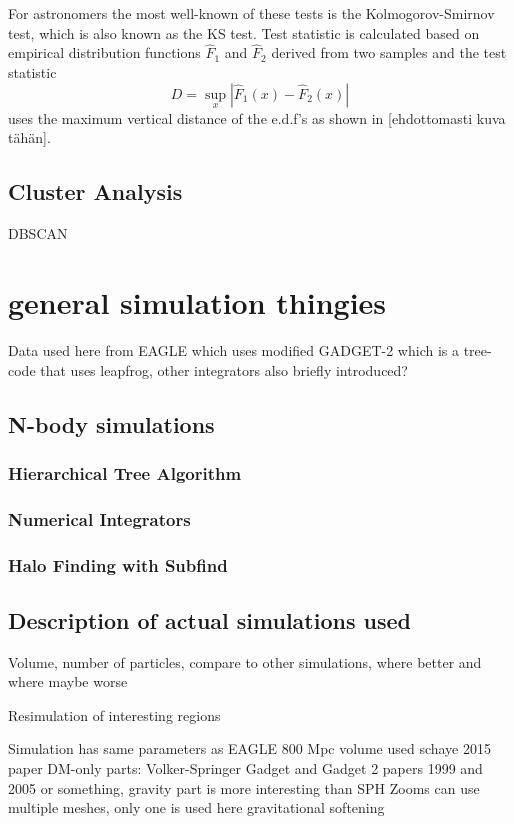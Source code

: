 \documentclass[english, oneside]{HYgradu}
\begin{document}
For astronomers the most well-known of these tests is the Kolmogorov-Smirnov test, which is also known as the KS test. Test statistic is calculated based on empirical distribution functions $\hat{F}_1$ and $\hat{F}_2$ derived from two samples and the test statistic
\begin{equation}
	D = \sup_{x} |\hat{F}_1(x) - \hat{F}_2(x)|
\end{equation}
uses the maximum vertical distance of the e.d.f's as shown in [ehdottomasti kuva tähän]. \citep{feigelson2012modern, bohm2010introduction}




\section{Cluster Analysis}
DBSCAN

\chapter{general simulation thingies}
Data used here from EAGLE which uses modified GADGET-2 which is a tree-code that uses leapfrog, other integrators also briefly introduced?
\section{N-body simulations}
\subsection{Hierarchical Tree Algorithm}
\subsection{Numerical Integrators}
\subsection{Halo Finding with Subfind} %

\section{Description of actual simulations used}
Volume, number of particles, compare to other simulations, where better and where maybe worse

Resimulation of interesting regions

Simulation has same parameters as EAGLE
800 Mpc volume used
schaye 2015 paper
DM-only parts: Volker-Springer Gadget and Gadget 2 papers 1999 and 2005 or something,     gravity part is more interesting than SPH 
Zooms can use multiple meshes, only one is used here
gravitational softening
\end{document}
